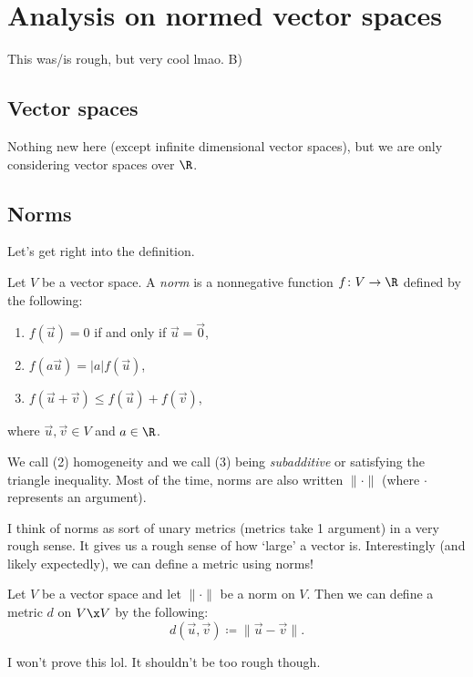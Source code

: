 \documentclass[class=article, crop=false]{standalone}
\begin{document}
\section{Analysis on normed vector spaces}

This was/is rough, but very cool lmao. B)

\subsection{Vector spaces}

Nothing new here (except infinite dimensional vector spaces), but we are only considering vector spaces over $\R$.

\subsection{Norms}

Let's get right into the definition.

\begin{defn}[Norm]
    Let $V$ be a vector space. A \textit{norm} is a nonnegative function $f \colon V \to \R$ defined by the following:
        \begin{enumerate}[(1)]
            \item $f(\vec u) = 0$ if and only if $\vec u =\vec 0$,
            \item $f(a\vec u) = |a| f(\vec u)$,
            \item $f(\vec u + \vec v) \leq f(\vec u) + f(\vec v)$,
        \end{enumerate}
    where $\vec u, \vec v \in V$ and $a \in \R$.
\end{defn}
\begin{rem}
    We call (2) homogeneity and we call (3) being \textit{subadditive} or satisfying the triangle inequality. Most of the time, norms are also written $\| \cdot \|$ (where $\cdot$ represents an argument).
\end{rem}

I think of norms as sort of unary metrics (metrics take 1 argument) in a very rough sense. It gives us a rough sense of how `large' a vector is. Interestingly (and likely expectedly), we can define a metric using norms!

\begin{fact}
    Let $V$ be a vector space and let $\| \cdot \|$ be a norm on $V$. Then we can define a metric $d$ on $V \x V$ by the following:
        \[
            d(\vec u, \vec v) \coloneqq \|\vec u - \vec v \|.
        \]
\end{fact}
I won't prove this lol. It shouldn't be too rough though.
\end{document}
